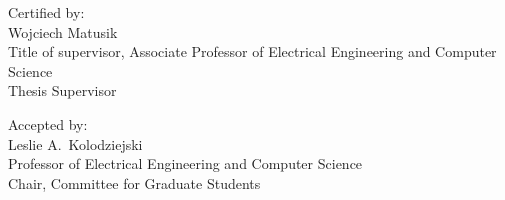 \vspace{.15in}

\noindent
Certified by: \underline{\mbox{\hspace{4.827in}}} \\
\vspace{-.25in}
{\flushright Wojciech Matusik\\
Title of supervisor, Associate Professor of Electrical Engineering and Computer Science \\
Thesis Supervisor \\
}

\vspace{.15in}

\noindent
Accepted by: \underline{\mbox{\hspace{4.79in}}} \\
\vspace{-.25in}
{\flushright Leslie A.~Kolodziejski \\
Professor of Electrical Engineering and Computer Science \\
Chair, Committee for Graduate Students \\
}

\cleardoublepage
